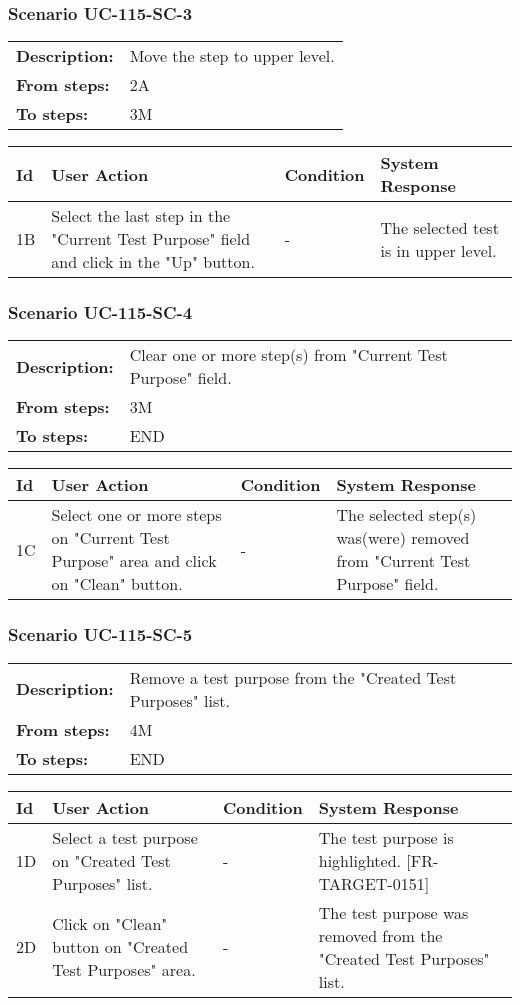 \documentclass[a4paper,11pt]{article}
\newcommand{\bl}{\\ \hline}
\begin{document}
\subsubsection*{Scenario UC-115-SC-3}
\begin{tabular}{p{1in}p{4in}}
{\bf Description:} & Move the step to upper level. \\
{\bf From steps:} & 2A \\
{\bf To steps:} & 3M \\
\end{tabular}
 
\begin{tabular}{|p{0.8in}|p{1.6in}|p{1.6in}|p{1.6in}|}
\hline
Id & User Action & Condition & System Response  \bl 
1B & Select the last step in the "Current Test Purpose" field and click in the "Up" button. & - & The selected test is in upper level. \bl 
\end{tabular}
\subsubsection*{Scenario UC-115-SC-4}
\begin{tabular}{p{1in}p{4in}}
{\bf Description:} & Clear one or more step(s) from "Current Test Purpose" field. \\
{\bf From steps:} & 3M \\
{\bf To steps:} & END \\
\end{tabular}
 
\begin{tabular}{|p{0.8in}|p{1.6in}|p{1.6in}|p{1.6in}|}
\hline
Id & User Action & Condition & System Response  \bl 
1C & Select one or more steps on "Current Test Purpose" area and click on "Clean" button. & - & The selected step(s) was(were) removed from "Current Test Purpose" field. \bl 
\end{tabular}
\subsubsection*{Scenario UC-115-SC-5}
\begin{tabular}{p{1in}p{4in}}
{\bf Description:} & Remove a test purpose from the "Created Test Purposes" list. \\
{\bf From steps:} & 4M \\
{\bf To steps:} & END \\
\end{tabular}
 
\begin{tabular}{|p{0.8in}|p{1.6in}|p{1.6in}|p{1.6in}|}
\hline
Id & User Action & Condition & System Response  \bl 
1D & Select a test purpose on "Created Test Purposes" list. & - & The test purpose is highlighted. [FR-TARGET-0151] \bl 
2D & Click on "Clean" button on "Created Test Purposes" area. & - & The test purpose was removed from the "Created Test Purposes" list. \bl 
\end{tabular}
\end{document}
